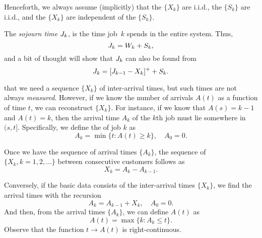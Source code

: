 Henceforth, we always assume (implicitly) that the $\{X_k\}$ are i.i.d., the $\{S_k\}$ are i.i.d., and the $\{X_k\}$ are independent of the $\{S_k\}$.


The \emph{sojourn time} $J_k$, is the time  job~$k$ spends in the entire system. Thus,
\begin{equation*}
 J_k = W_{k} + S_k, 
\end{equation*}
and a bit of thought will show that $J_k$ can also be found from
\begin{equation*}
\label{eq:59}
J_{k} = [J_{k-1} - X_k]^+ + S_k.
\end{equation*}


 that we need a sequence $\{X_k\}$ of inter-arrival times, but such times are not always \emph{measured}.
However, if we know the number of arrivals $A(t)$ as a function of time $t$, we can reconstruct $\{X_k\}$.
For instance, if we know that $A(s) = k-1$ and $A(t) = k$, then the arrival time $A_k$ of the $k$th job must lie somewhere in $(s,t]$.
Specifically, we define the  of job $k$ as
\begin{equation*}
 A_k = \min\{t: A(t) \geq k\}, \quad A_0 = 0.
\end{equation*}


Once we have the sequence of arrival times $\{A_k\}$, the sequence of  $\{X_k, k=1, 2, \ldots\}$ between consecutive customers follows as 
\begin{equation*}
 X_k = A_k - A_{k-1}.
\end{equation*}

Conversely, if the basic data consists of the inter-arrival times $\{X_k\}$, we find the arrival times with the recursion
\begin{equation}\label{eq:29}
 A_k = A_{k-1} + X_k, \quad A_0 = 0.
\end{equation}
And then, from the  arrival times $\{A_k\}$, we can define  $A(t)$ as 
\begin{equation} \label{eq:2}
 A(t) = \max\{k: A_k \leq t\}.
\end{equation}
Observe that the function $t\to A(t)$ is right-continuous.

